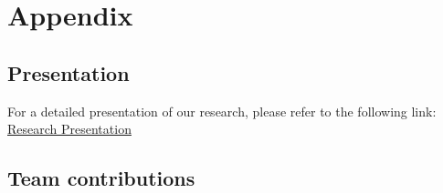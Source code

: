 {\small


}

\vspace{0.2cm}
\section*{Appendix}
\subsection*{Presentation}

For a detailed presentation of our research, please refer to the following link: \href{https://docs.google.com/presentation/d/1riuebD4uW5ZjYBOXnilTC_b8eFHUnTPdp-qzGSgNB9I/edit?usp=sharing}{Research Presentation}

\vspace{0.3cm}

\subsection*{Team contributions}

\vspace{0.1cm}

